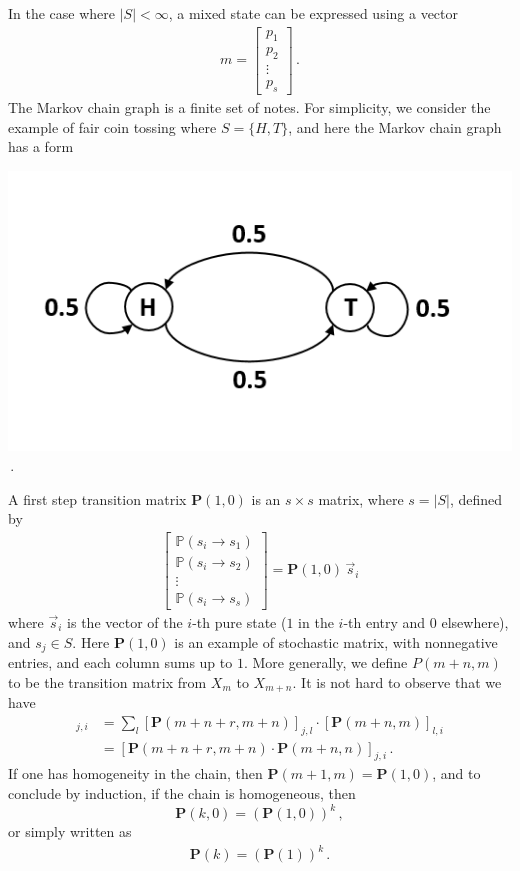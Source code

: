 \documentclass[11pt, onesided]{book}
\theoremstyle{break}
\theoremstyle{break}
\newcommand{\bmat}[1]{\begin{bmatrix} #1 \end{bmatrix}}
\begin{document}
In the case where $|S| < \infty$, a mixed state can be expressed using a vector
\begin{align*}
m = \bmat{p_1 \\ p_2 \\ \vdots \\ p_s}\,.
\end{align*} 
The Markov chain graph is a finite set of notes. For simplicity, we consider the example of fair coin tossing where $S = \{H, T\}$, and here the Markov chain graph has a form
\begin{center}
\includegraphics[scale=0.5]{MCGraph}\,.
\end{center}

A first step transition matrix $\mathbf{P}(1,0)$ is an $s\times s$ matrix, where $s = |S|$, defined by
\begin{align*}
\bmat{\mathbb{P}(s_i \to s_1)\\
\mathbb{P}(s_i \to s_2)\\
\vdots\\
\mathbb{P}(s_i \to s_s)} = \mathbf{P}(1,0)\, \vec{s}_i
\end{align*}
where $\vec{s}_i$ is the vector of the $i$-th pure state ($1$ in the $i$-th entry and $0$ elsewhere), and $s_j \in S$. Here $\mathbf{P}(1,0)$ is an example of stochastic matrix, with nonnegative entries, and each column sums up to $1$. More generally, we define $P(m+n,m)$ to be the transition matrix from $X_m$ to $X_{m+n}$. It is not hard to observe that we have
\begin{align*}
[\mathbf{P}(m+n +r, m)]_{j,i} 
&= \sum_l [\mathbf{P}(m+n+r,m+n)]_{j,l}\cdot [\mathbf{P}(m+n,m)]_{l,i} \\
&= [\mathbf{P}(m+n+r,m+n)\cdot \mathbf{P}(m+n,n)]_{j,i}\,.
\end{align*} 
If one has homogeneity in the chain, then $\mathbf{P}(m+1,m) = \mathbf{P}(1,0)$, and to conclude by induction, if the chain is homogeneous, then 
$$\mathbf{P}(k,0) = \left(\mathbf{P}(1,0)\right)^k\,,$$
or simply written as
\begin{align*}
\mathbf{P}(k) = (\mathbf{P}(1))^k\,.
\end{align*}
\end{document}

